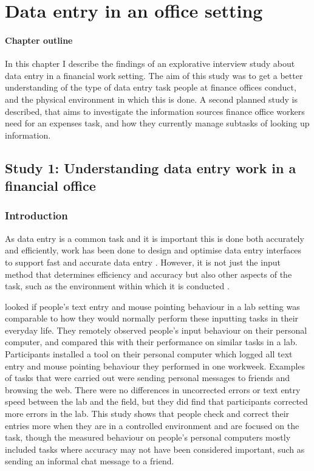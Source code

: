 \chapter{Data entry in an office setting}\label{ch:Study1}
\begin{mynote}
\subsubsection{Chapter outline}

In this chapter I describe the findings of an explorative interview study about data entry in a financial work setting. The aim of this study was to get a better understanding of the type of data entry task people at finance offices conduct, and the physical environment in which this is done.
A second planned study is described, that aims to investigate the information sources finance office workers need for an expenses task, and how they currently manage subtasks of looking up information.

\end{mynote}

\section{Study 1: Understanding data entry work in a financial office}\label{ch:Study1}
 
\subsection{Introduction}
As data entry is a common task and it is important this is done both accurately and efficiently, work has been done to design and optimise data entry interfaces to support fast and accurate data entry \citep[e.g.][]{Oladimeji2013, Vertanen2015, Wiseman2013a}.
However, it is not just the input method that determines efficiency and accuracy but also other aspects of the task, such as the environment within which it is conducted \citep{Payne2013, Randall2014}.

\citet{Evans2012} looked if people's text entry and mouse pointing behaviour in a lab setting was comparable to how they would normally perform these inputting tasks in their everyday life. They remotely observed people's input behaviour on their personal computer, and compared this with their performance on similar tasks in a lab. Participants installed a tool on their personal computer which logged all text entry and mouse pointing behaviour they performed in one workweek. Examples of tasks that were carried out were sending personal messages to friends and browsing the web. There were no differences in uncorrected errors or text entry speed between the lab and the field, but they did find that participants corrected more errors in the lab. This study shows that people check and correct their entries more when they are in a controlled environment and are focused on the task, though the measured behaviour on people's personal computers mostly included tasks where accuracy may not have been considered important, such as sending an informal chat message to a friend. 


